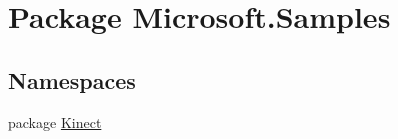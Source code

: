 \hypertarget{namespace_microsoft_1_1_samples}{\section{Package Microsoft.\+Samples}
\label{namespace_microsoft_1_1_samples}
}
\subsection*{Namespaces}
\begin{DoxyCompactItemize}
\item 
package \hyperlink{namespace_microsoft_1_1_samples_1_1_kinect}{Kinect}
\end{DoxyCompactItemize}
